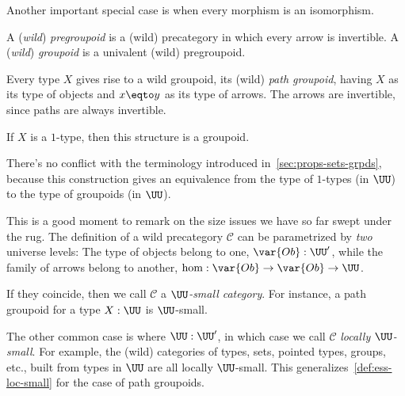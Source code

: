 Another important special case is when every morphism is an isomorphism.
\begin{definition}
  A (\emph{wild}) \emph{pregroupoid} is a (wild) precategory in which every
  arrow is invertible.
  A (\emph{wild}) \emph{groupoid} is a univalent (wild) pregroupoid.
\end{definition}
\begin{example}
  Every type $X$ gives rise to a wild groupoid, its (wild) \emph{path groupoid},
  having $X$ as its type of objects and $x \eqto y$ as its type of arrows.
  The arrows are invertible, since paths are always invertible.

  If $X$ is a $1$-type, then this structure is a groupoid.
\end{example}
There's no conflict with the terminology introduced in~\cref{sec:props-sets-grpds},
because this construction gives an equivalence
from the type of $1$-types (in $\UU$) to the type of groupoids (in $\UU$).

\begin{remark}
  This is a good moment to remark on the size issues
  we have so far swept under the rug.
  The definition of a wild precategory $\mathcal C$ can be parametrized by
  \emph{two} universe levels: The type of objects belong to one, $\var{Ob}:\UU'$,
  while the family of arrows belong to another, $\hom : \var{Ob} \to \var{Ob} \to \UU$.

  If they coincide, then we call $\mathcal C$ a \emph{$\UU$-small category}.
  For instance, a path groupoid for a type $X:\UU$ is $\UU$-small.

  The other common case is where $\UU:\UU'$, in which case
  we call $\mathcal C$ \emph{locally $\UU$-small}.
  For example, the (wild) categories of types, sets, pointed types, groups, etc., built
  from types in $\UU$ are all locally $\UU$-small.
  This generalizes~\cref{def:ess-loc-small} for the case of path groupoids.
\end{remark}

